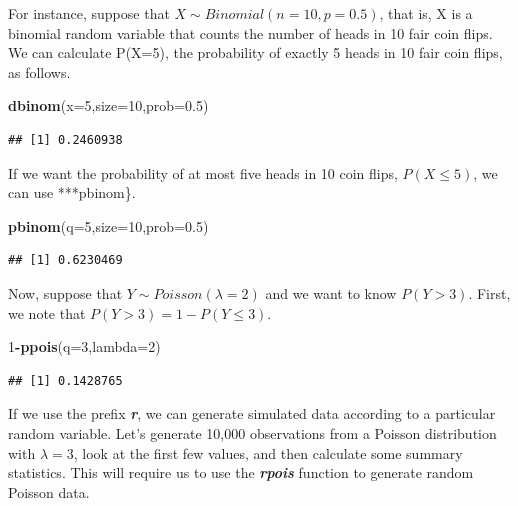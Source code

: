 \documentclass[
  11pt,
  oneside]{book}
\newenvironment{Shaded}{\begin{snugshade}}{\end{snugshade}}
\newcommand{\AttributeTok}[1]{\textcolor[rgb]{0.13,0.29,0.53}{#1}}
\newcommand{\DecValTok}[1]{\textcolor[rgb]{0.00,0.00,0.81}{#1}}
\newcommand{\FloatTok}[1]{\textcolor[rgb]{0.00,0.00,0.81}{#1}}
\newcommand{\FunctionTok}[1]{\textcolor[rgb]{0.13,0.29,0.53}{\textbf{#1}}}
\newcommand{\NormalTok}[1]{#1}
\newcommand{\SpecialCharTok}[1]{\textcolor[rgb]{0.81,0.36,0.00}{\textbf{#1}}}
\theoremstyle{definition}
\theoremstyle{definition}
\theoremstyle{definition}
\theoremstyle{definition}
\theoremstyle{remark}
\begin{document}
For instance, suppose that \(X \sim Binomial(n=10,p=0.5)\), that is, X is a binomial random variable that counts the number of heads in 10 fair coin flips. We can calculate P(X=5), the probability of exactly 5 heads in 10 fair coin flips, as follows.

\begin{Shaded}
\begin{Highlighting}[]
\FunctionTok{dbinom}\NormalTok{(}\AttributeTok{x=}\DecValTok{5}\NormalTok{,}\AttributeTok{size=}\DecValTok{10}\NormalTok{,}\AttributeTok{prob=}\FloatTok{0.5}\NormalTok{)}
\end{Highlighting}
\end{Shaded}

\begin{verbatim}
## [1] 0.2460938
\end{verbatim}

If we want the probability of at most five heads in 10 coin flips, \(P(X \leq 5)\), we can use ***pbinom\}.

\begin{Shaded}
\begin{Highlighting}[]
\FunctionTok{pbinom}\NormalTok{(}\AttributeTok{q=}\DecValTok{5}\NormalTok{,}\AttributeTok{size=}\DecValTok{10}\NormalTok{,}\AttributeTok{prob=}\FloatTok{0.5}\NormalTok{)}
\end{Highlighting}
\end{Shaded}

\begin{verbatim}
## [1] 0.6230469
\end{verbatim}

Now, suppose that \(Y \sim Poisson(\lambda = 2)\) and we want to know \(P(Y > 3)\). First, we note that \(P(Y > 3) = 1 - P(Y \leq 3)\).

\begin{Shaded}
\begin{Highlighting}[]
\DecValTok{1}\SpecialCharTok{{-}}\FunctionTok{ppois}\NormalTok{(}\AttributeTok{q=}\DecValTok{3}\NormalTok{,}\AttributeTok{lambda=}\DecValTok{2}\NormalTok{)}
\end{Highlighting}
\end{Shaded}

\begin{verbatim}
## [1] 0.1428765
\end{verbatim}

If we use the prefix \textbf{\emph{r}}, we can generate simulated data according to a particular random variable. Let's generate 10,000 observations from a Poisson distribution with \(\lambda=3\), look at the first few values, and then calculate some summary statistics. This will require us to use the \textbf{\emph{rpois}} function to generate random Poisson data.
\end{document}
